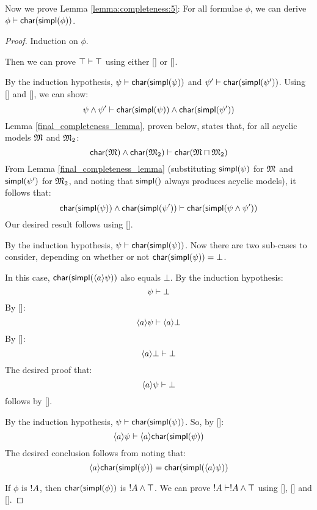Now we prove Lemma \ref{lemma:completeness:5}: 
For all formulae $\phi$, we can derive $\phi \vdash \mathsf{char}(\mathsf{simpl}(\phi))$.

\begin{proof}
Induction on $\phi$.


 Then we can prove $\top \vdash \top$ using
either [] or [].

 By the induction hypothesis,
$\psi \vdash \mathsf{char}(\mathsf{simpl}(\psi))$ and $\psi' \vdash
\mathsf{char}(\mathsf{simpl}(\psi'))$.  Using [] and [], we can show:
\[
\psi \land \psi' \vdash  \mathsf{char}(\mathsf{simpl}(\psi)) \land  \mathsf{char}(\mathsf{simpl}(\psi'))
\]
Lemma \ref{final_completeness_lemma}, proven below, states that, for all acyclic models $\frak{M}$ and $\frak{M}_2$:
\[
  \mathsf{char}(\frak{M}) \land  \mathsf{char}(\frak{M}_2) \vdash  \mathsf{char}(\frak{M} \sqcap \frak{M}_2)
\]
From Lemma \ref{final_completeness_lemma} (substituting $\mathsf{simpl}(\psi)$ for $\frak{M}$ and $\mathsf{simpl}(\psi')$ for $\frak{M}_2$, and noting that $\mathsf{simpl}()$ always produces acyclic models), it follows that:
\[
 \mathsf{char}(\mathsf{simpl}(\psi)) \land  \mathsf{char}(\mathsf{simpl}(\psi')) \vdash  \mathsf{char}(\mathsf{simpl}(\psi \land \psi'))
\]
Our desired result follows using [].

 By the induction
hypothesis, $\psi \vdash \mathsf{char}(\mathsf{simpl}(\psi))$.  Now there are two
sub-cases to consider, depending on whether or not $
\CHAR{\SIMPL{\psi}} = \bot$.  

\SUBCASE{$ \CHAR{\SIMPL{\psi}} = \bot$} In this case, $
\mathsf{char}(\mathsf{simpl}(\langle a \rangle \psi))$ also equals $\bot$.  By the
induction hypothesis:
\[
\psi \vdash \bot
\]
By []:
\[
\langle a \rangle \psi \vdash \langle a \rangle \bot
\]
By []:
\[
\langle a \rangle \bot \vdash \bot
\]
The desired proof that:
\[
\langle a \rangle \psi \vdash \bot
\]
follows by [].

\SUBCASE{$ \CHAR{\SIMPL{\psi}} \neq \bot$}
By the induction hypothesis, $\psi \vdash  \mathsf{char}(\mathsf{simpl}(\psi))$.
So, by []:
\[
\langle a \rangle \psi \vdash \langle a \rangle  \mathsf{char}(\mathsf{simpl}(\psi))
\]
The desired conclusion follows from noting that:
\[
 \langle a \rangle  \mathsf{char}(\mathsf{simpl}(\psi)) =  \mathsf{char}(\mathsf{simpl}(\langle a \rangle \psi))
 \]

  If $\phi$ is $! A$, then $
 \mathsf{char}(\mathsf{simpl}(\phi))$ is $! A \land \top$.  We can prove $! A
 \vdash ! A \land \top$ using [], [] and [].
\end{proof}

